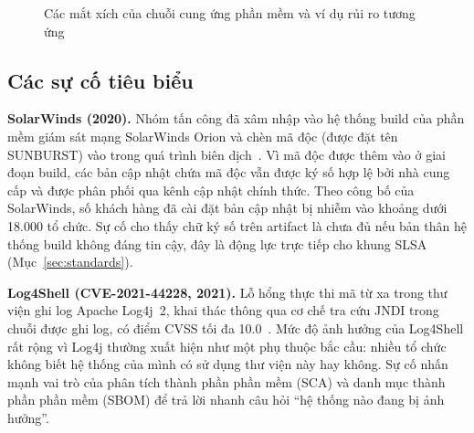 \documentclass[12pt,a4paper,oneside]{extreport}
\begin{document}
\begin{figure}[!htbp]
  \centering
  \caption{Các mắt xích của chuỗi cung ứng phần mềm và ví dụ rủi ro tương ứng}
  \label{fig:supply-chain}
\end{figure}
\FloatBarrier

\subsection{Các sự cố tiêu biểu}
\textbf{SolarWinds (2020).} Nhóm tấn công đã xâm nhập vào hệ thống build của
phần mềm giám sát mạng SolarWinds Orion và chèn mã độc (được đặt tên SUNBURST)
vào trong quá trình biên dịch~\cite{mandiant-sunburst}. Vì mã độc được thêm vào
ở giai đoạn build, các bản cập nhật chứa mã độc vẫn được ký số hợp lệ bởi nhà
cung cấp và được phân phối qua kênh cập nhật chính thức. Theo công bố của
SolarWinds, số khách hàng đã cài đặt bản cập nhật bị nhiễm vào khoảng dưới
18.000 tổ chức. Sự cố cho thấy chữ ký số trên artifact là chưa đủ nếu bản thân
hệ thống build không đáng tin cậy, đây là động lực trực tiếp cho khung SLSA
(Mục~\ref{sec:standards}).

\textbf{Log4Shell (CVE-2021-44228, 2021).} Lỗ hổng thực thi mã từ xa trong thư
viện ghi log Apache Log4j~2, khai thác thông qua cơ chế tra cứu JNDI trong chuỗi
được ghi log, có điểm CVSS tối đa 10.0~\cite{nvd-log4shell}. Mức độ ảnh hưởng
của Log4Shell rất rộng vì Log4j thường xuất hiện như một phụ thuộc bắc cầu:
nhiều tổ chức không biết hệ thống của mình có sử dụng thư viện này hay không.
Sự cố nhấn mạnh vai trò của phân tích thành phần phần mềm (SCA) và danh mục
thành phần phần mềm (SBOM) để trả lời nhanh câu hỏi ``hệ thống nào đang bị ảnh
hưởng''.
\end{document}
